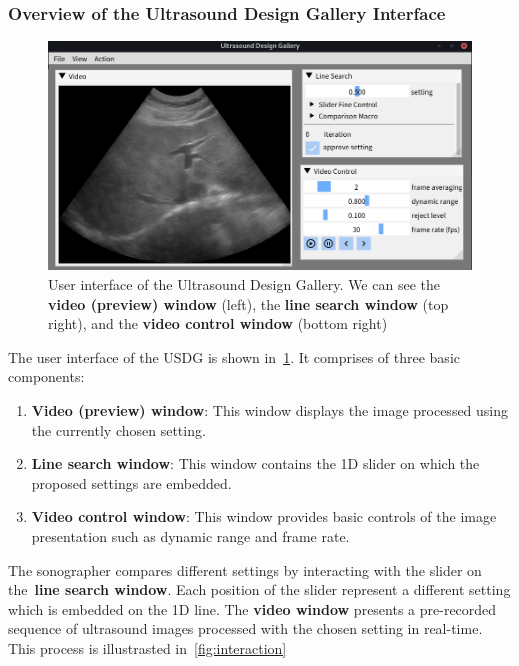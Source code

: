 \subsubsection{Overview of the Ultrasound Design Gallery Interface}
%
\begin{figure}[h]
  \centering
  \includegraphics[scale=0.30]{figures/ui.png}
  \caption{User interface of the Ultrasound Design Gallery. We can see the \textbf{video (preview) window} (left), the \textbf{line search window} (top right), and the \textbf{video control window} (bottom right) }\label{fig:ui}
\end{figure}
%
The user interface of the USDG is shown in~\cref{fig:ui}.
It comprises of three basic components:
\begin{enumerate}
  \item[\ding{228}] \textbf{Video (preview) window}: This window displays the image processed using the currently chosen setting.
  \item[\ding{228}] \textbf{Line search window}: This window contains the 1D slider on which the proposed settings are embedded.
  \item[\ding{228}] \textbf{Video control window}: This window provides basic controls of the image presentation such as dynamic range and frame rate.
\end{enumerate}
The sonographer compares different settings by interacting with the slider on the~\textbf{line search window}.
Each position of the slider represent a different setting which is embedded on the 1D line.
The \textbf{video window} presents a pre-recorded sequence of ultrasound images processed with the chosen setting in real-time.
This process is illustrasted in~\cref{fig:interaction}

